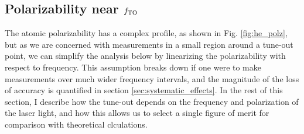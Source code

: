 \subsection{Polarizability near $f_\mathrm{TO}$}
\label{sec:polz_linearization}


	
	The atomic polarizability has a complex profile, as shown in Fig. \ref{fig:he_polz}, but as we are concerned with measurements in a small region around a tune-out point, we can simplify the analysis below by linearizing the polarizability with respect to frequency. This assumption breaks down if one were to make measurements over much wider frequency intervals, and the magnitude of the loss of accuracy is quantified in section \ref{sec:systematic_effects}.
	In the rest of this section, I describe how the tune-out depends on the frequency and polarization of the laser light, and how this allows us to select a single figure of merit for comparison with theoretical clculations.

